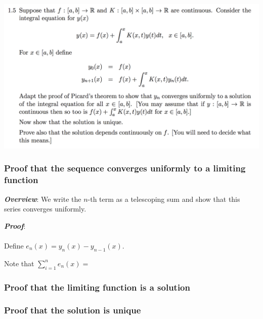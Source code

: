 \documentclass[12pt]{article}
\begin{document}
\newpage
\subsection*{}  %
\begin{mdframed}
\includegraphics[width=400pt]{img/differential-equations-a1-1-5.png}
\end{mdframed}

\subsubsection*{Proof that the sequence converges uniformly to a limiting function}

\textbf{\textit{Overview}}: We write the $n$-th term as a telescoping sum and show that
this series converges uniformly.

\textbf{\textit{Proof}}:\\\\
Define $e_n(x) = y_n(x) - y_{n-1}(x)$.

Note that $\sum_{i=1}^n e_n(x) = $

\subsubsection*{Proof that the limiting function is a solution}


\subsubsection*{Proof that the solution is unique}
\end{document}
